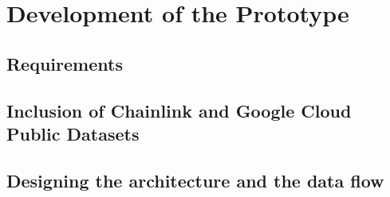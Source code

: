 \chapter{Development of the Prototype}\label{chapter:development_prototype}
\section{Requirements}\label{section:requirements}
\section{Inclusion of Chainlink and Google Cloud Public Datasets}\label{section:inclusion_chainlink_google_cloud_datasets}
\section{Designing the architecture and the data flow}\label{section:designing_architecture_data_flow}
